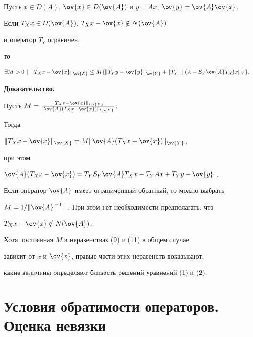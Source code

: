 \begin{thm}


Пусть $x\in D(A)$, $\ov{x}\in D(\ov{A})$ и $y=Ax$, $\ov{y}=\ov{A}\ov{x}$.


Если $T_Xx\in D(\ov{A})$, $T_Xx-\ov{x}\notin N(\ov{A})$


и оператор $T_Y$ ограничен,


то


\begin{equation}


\exists M>0 \,\mid\,


\nr{T_Xx-\ov{x}}_{\ov{X}} \le M \{ \nr{T_Yy-\ov{y}}_{\ov{Y}}


+ \nr{T_Y}\,\nr{(A-S_Y\ov{A} T_X)x}_Y \}.


\end{equation}


\end{thm}





{\bf Доказательство.}


Пусть $M=\frac{\nr{T_Xx-\ov{x}}_{\ov{X}}}


{\nr{\ov{A}(T_Xx-\ov{x})}_{\ov{Y}}}$.


Тогда


$\nr{T_Xx-\ov{x}}_{\ov{X}} = M \nr{\ov{A} (T_Xx-\ov{x})}_{\ov{Y}}$,


при этом


$\ov{A}(T_Xx-\ov{x}) =


T_YS_Y\ov{A} T_Xx - T_YAx + T_Yy - \ov{y}$ .


Если оператор $\ov{A} $ имеет ограниченный обратный, то можно выбрать


$M=1/\nr{\ov{A} ^{\,-1}}$ . При этом нет необходимости предполагать, что


$T_Xx-\ov{x} \notin N(\ov{A} )$.


\medskip





Хотя постоянная $M$ в неравенствах (9) и (11) в общем случае


зависит от $x$ и $\ov{x}$, правые части этих неравенств показывают,


какие величины определяют близость решений уравнений (1) и (2).





\section{Условия обратимости операторов. Оценка невязки}





